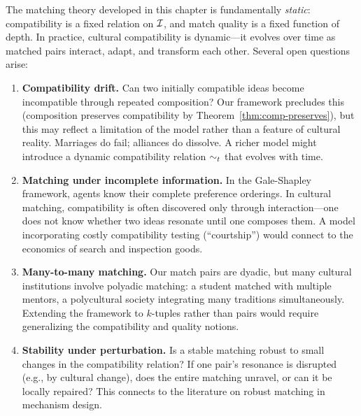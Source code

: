 \begin{remark}
The matching theory developed in this chapter is fundamentally
\emph{static}: compatibility is a fixed relation on $\mathcal{I}$, and match
quality is a fixed function of depth.  In practice, cultural compatibility
is dynamic---it evolves over time as matched pairs interact, adapt, and
transform each other.  Several open questions arise:

\begin{enumerate}
\item \textbf{Compatibility drift.}  Can two initially compatible ideas
  become incompatible through repeated composition?  Our framework precludes
  this (composition preserves compatibility by Theorem~\ref{thm:comp-preserves}),
  but this may reflect a limitation of the model rather than a feature of
  cultural reality.  Marriages do fail; alliances do dissolve.  A richer
  model might introduce a dynamic compatibility relation
  $\sim_t$ that evolves with time.

\item \textbf{Matching under incomplete information.}  In the
  Gale-Shapley framework, agents know their complete preference orderings.
  In cultural matching, compatibility is often discovered only through
  interaction---one does not know whether two ideas resonate until one
  composes them.  A model incorporating costly compatibility testing
  (``courtship'') would connect to the economics of search and inspection
  goods.

\item \textbf{Many-to-many matching.}  Our match pairs are dyadic, but
  many cultural institutions involve polyadic matching: a student matched
  with multiple mentors, a polycultural society integrating many traditions
  simultaneously.  Extending the framework to $k$-tuples rather than pairs
  would require generalizing the compatibility and quality notions.

\item \textbf{Stability under perturbation.}  Is a stable matching robust
  to small changes in the compatibility relation?  If one pair's resonance
  is disrupted (e.g., by cultural change), does the entire matching unravel,
  or can it be locally repaired?  This connects to the literature on robust
  matching in mechanism design.
\end{enumerate}
\end{remark}

